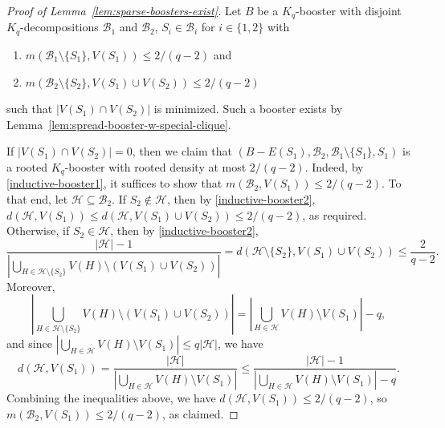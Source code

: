 \documentclass[11pt]{article}
\numberwithin{equation}{section}
\newcounter{i}
\theoremstyle{plain}
\theoremstyle{plain} %
\theoremstyle{definition}
\newcommand{\cB}{\mathcal{B}}
\newcommand{\cH}{\mathcal{H}}
\begin{document}
\begin{proof}[Proof of Lemma~\ref{lem:sparse-boosters-exist}]
    Let $B$ be a $K_q$-booster with disjoint $K_q$-decompositions $\cB_1$ and $\cB_2$, $S_i \in \cB_i$ for $i \in \{1,2\}$ with
    \begin{enumerate}[label=(\ref*{lem:sparse-boosters-exist}.\arabic*), leftmargin=*]
        \item\label{inductive-booster1} $m(\cB_1\setminus\{S_1\}, V(S_1)) \leq 2 / (q-2)$ and
        \item\label{inductive-booster2} $m(\cB_2\setminus\{S_2\}, V(S_1) \cup V(S_2)) \leq 2/(q - 2)$
    \end{enumerate}
    such that $|V(S_1) \cap V(S_2)|$ is minimized.    
    Such a booster exists by Lemma~\ref{lem:spread-booster-w-special-clique}.  
    
    If $|V(S_1) \cap V(S_2)| = 0$, then we claim that $(B - E(S_1), \cB_2, \cB_1\setminus\{S_1\}, S_1)$ is a rooted $K_q$-booster with rooted density at most $2/(q - 2)$.  Indeed, by \ref{inductive-booster1}, it suffices to show that $m(\cB_2, V(S_1)) \leq 2 / (q - 2)$.  To that end, let $\cH \subseteq \cB_2$.  If $S_2 \notin \cH$, then by \ref{inductive-booster2}, $d(\cH, V(S_1)) \leq d(\cH, V(S_1) \cup V(S_2)) \leq 2/(q - 2)$, as required.  Otherwise, if $S_2 \in \cH$, then by \ref{inductive-booster2},
    \begin{equation*}
         \frac{|\cH| - 1}{|\bigcup_{H\in \cH\setminus\{S_2\}}V(H)\setminus (V(S_1) \cup V(S_2))|} = d(\cH\setminus\{S_2\}, V(S_1) \cup V(S_2)) \leq \frac{2}{q - 2}.
    \end{equation*}
    Moreover,
    \begin{equation*}
        \left|\bigcup_{H\in \cH\setminus\{S_2\}}V(H)\setminus (V(S_1) \cup V(S_2))\right| = \left|\bigcup_{H\in \cH}V(H)\setminus V(S_1)\right| - q,
    \end{equation*}
    and since $|\bigcup_{H\in \cH}V(H)\setminus V(S_1)| \leq q|\cH|$, we have
    \begin{equation*}
        d(\cH, V(S_1)) = \frac{|\cH|}{|\bigcup_{H\in \cH}V(H)\setminus V(S_1)|} \leq \frac{|\cH| - 1}{|\bigcup_{H\in \cH}V(H)\setminus V(S_1)| - q}.
    \end{equation*}
    Combining the inequalities above, we have $d(\cH, V(S_1)) \leq 2 / (q - 2)$, so $m(\cB_2, V(S_1)) \leq 2/(q - 2)$, as claimed.
    

\end{proof}
\end{document}
